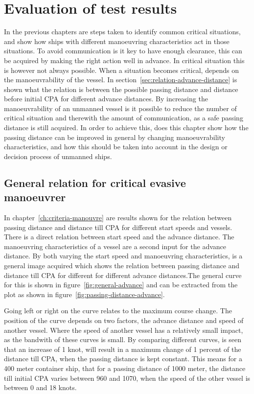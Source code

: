 \chapter{Evaluation of test results}
In the previous chapters are steps taken to identify common critical situations, and show how ships with different manoeuvring characteristics act in those situations. To avoid communication is it key to have enough clearance, this can be acquired by making the right action well in advance. In critical situation this is however not always possible. When a situation becomes critical, depends on the manoeuvrability of the vessel. In section~\ref{sec:relation-advance-distance} is shown what the relation is between the possible passing distance and distance before initial CPA for different advance distances. By increasing the manoeuvrability of an unmanned vessel is it possible to reduce the number of critical situation and therewith the amount of communication, as a safe passing distance is still acquired. In order to achieve this, does this chapter show how the passing distance can be improved in general by changing manoeuvrability characteristics, and how this should be taken into account in the design or decision process of unmanned ships.

\section{General relation for critical evasive manoeuvrer}
In chapter~\ref{ch:criteria-manouvre} are results shown for the relation between passing distance and distance till CPA for different start speeds and vessels. There is a direct relation between start speed and the advance distance. The manoeuvring characteristics of a vessel are a second input for the advance distance. By both varying the start speed and manoeuvring characteristics, is a general image acquired which shows the relation between passing distance and distance till CPA for different for different advance distances.The general curve for this is shown in figure~\ref{fig:general-advance} and can be extracted from the plot as shown in figure~\ref{fig:passing-distance-advance}.

Going left or right on the curve relates to the maximum course change. The position of the curve depends on two factors, the advance distance and speed of another vessel. Where the speed of another vessel has a relatively small impact, as the bandwith of these curves is small. By comparing different curves, is seen that an increase of 1 knot, will result in a maximum change of 1 percent of the distance till \ac{CPA}, when the passing distance is kept constant. This means for a 400 meter container ship, that for a passing distance of 1000 meter, the distance till initial CPA varies between 960 and 1070, when the speed of the other vessel is between 0 and 18 knots.

